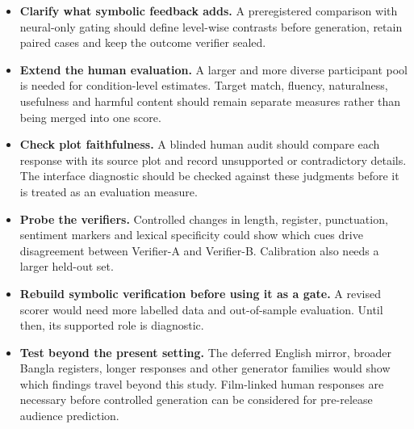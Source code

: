 \begin{itemize}
    \setlength{\itemsep}{3pt}
    \setlength{\parskip}{0pt}
    \setlength{\parsep}{0pt}
    \item \textbf{Clarify what symbolic feedback adds.} A preregistered comparison with neural-only gating should define level-wise contrasts before generation, retain paired cases and keep the outcome verifier sealed.
    \item \textbf{Extend the human evaluation.} A larger and more diverse participant pool is needed for condition-level estimates. Target match, fluency, naturalness, usefulness and harmful content should remain separate measures rather than being merged into one score.
    \item \textbf{Check plot faithfulness.} A blinded human audit should compare each response with its source plot and record unsupported or contradictory details. The interface diagnostic should be checked against these judgments before it is treated as an evaluation measure.
    \item \textbf{Probe the verifiers.} Controlled changes in length, register, punctuation, sentiment markers and lexical specificity could show which cues drive disagreement between Verifier-A and Verifier-B. Calibration also needs a larger held-out set.
    \item \textbf{Rebuild symbolic verification before using it as a gate.} A revised scorer would need more labelled data and out-of-sample evaluation. Until then, its supported role is diagnostic.
    \item \textbf{Test beyond the present setting.} The deferred English mirror, broader Bangla registers, longer responses and other generator families would show which findings travel beyond this study. Film-linked human responses are necessary before controlled generation can be considered for pre-release audience prediction.
\end{itemize}
